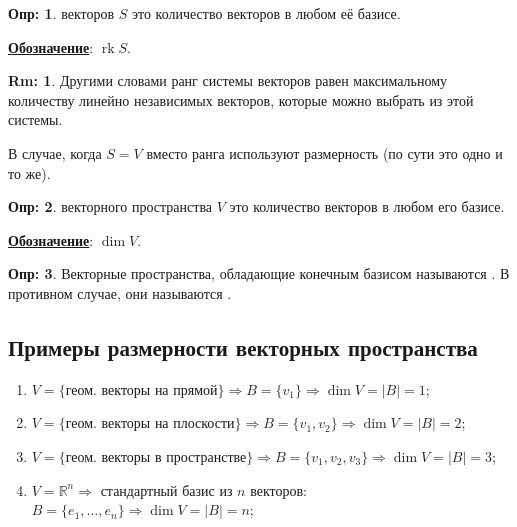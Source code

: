 \documentclass[12pt]{article}
\newcommand{\MR}{\mathbb{R}}
\theoremstyle{definition}
\newtheorem{defn}{Опр:}
\newtheorem{rem}{Rm:}
\DeclareMathOperator{\rk}{\text{rk}}
\begin{document}
\begin{defn}
	 векторов $S$ это количество векторов в любом её базисе.
	
	\uline{\textbf{Обозначение}}: $\rk{S}$.
\end{defn}
\begin{rem}
	Другими словами ранг системы векторов равен максимальному количеству линейно независимых векторов, которые можно выбрать из этой системы.
\end{rem}
В случае, когда $S = V$ вместо ранга используют размерность (по сути это одно и то же).
\begin{defn}
	 векторного пространства $V$ это количество векторов в любом его базисе. 
	
	\uline{\textbf{Обозначение}}: $\dim{V}$.
\end{defn}
\begin{defn}
	Векторные пространства, обладающие конечным базисом называются . В противном случае, они называются .
\end{defn}

\subsection*{Примеры размерности векторных пространства}
\begin{enumerate}[label=\arabic*)]
	\item $V = \{\text{геом. векторы на прямой}\} \Rightarrow B = \{v_1\} \Rightarrow \dim{V} = |B| = 1$;
	\item $V = \{\text{геом. векторы на плоскости}\}\Rightarrow B = \{v_1, v_2\} \Rightarrow \dim{V} = |B| = 2$;
	\item $V = \{\text{геом. векторы в пространстве}\}\Rightarrow B = \{v_1, v_2, v_3\} \Rightarrow \dim{V} = |B| = 3$;
	\item $V = \MR^n \Rightarrow$ стандартный базис из $n$ векторов: $B = \{e_1,\dotsc,e_n\} \Rightarrow \dim{V} = |B| = n$;
\end{enumerate}
\end{document}
